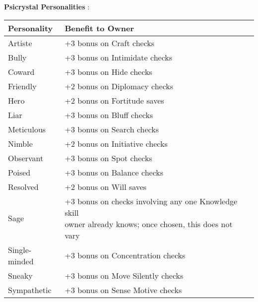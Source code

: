 \textbf{Psicrystal Personalities
}:
\begin{center}
\begin{adjustwidth}{-4cm}{}
\begin{small}
\begin{tabular}{| l | l |}
\hline
Personality &Benefit to Owner \\
\hline
Artiste &+3 bonus on Craft checks \\
Bully &+3 bonus on Intimidate checks \\
Coward &+3 bonus on Hide checks \\
Friendly &+2 bonus on Diplomacy checks \\
Hero &+2 bonus on Fortitude saves \\
Liar &+3 bonus on Bluff checks \\
Meticulous &+3 bonus on Search checks \\
Nimble &+2 bonus on Initiative checks \\
Observant &+3 bonus on Spot checks \\
Poised &+3 bonus on Balance checks \\
Resolved &+2 bonus on Will saves \\
Sage &\makecell{+3 bonus on checks involving any one Knowledge skill\\ owner already knows; once chosen, this does not vary} \\
Single-minded &+3 bonus on Concentration checks \\
Sneaky &+3 bonus on Move Silently checks \\
Sympathetic &+3 bonus on Sense Motive checks \\
\hline
\end{tabular}
\end{small}
\end{adjustwidth}
\end{center}

